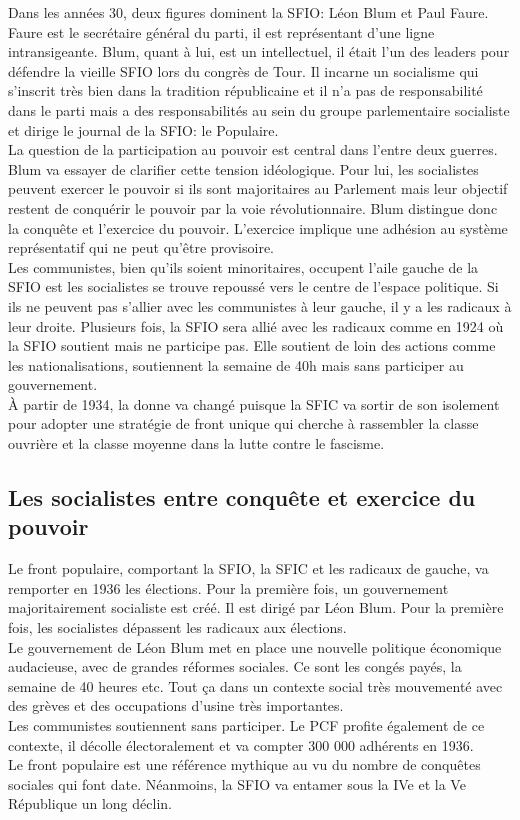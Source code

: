 \documentclass[10pt, a4paper, openany]{book}
\begin{document}
Dans les années 30, deux figures dominent la SFIO: Léon Blum et Paul Faure. Faure est le secrétaire général du parti, il est représentant d'une ligne intransigeante. Blum, quant à lui, est un intellectuel, il était l'un des leaders pour défendre la vieille SFIO lors du congrès de Tour. Il incarne un socialisme qui s'inscrit très bien dans la tradition républicaine et il n'a pas de responsabilité dans le parti mais a des responsabilités au sein du groupe parlementaire socialiste et dirige le journal de la SFIO: le Populaire. \\
La question de la participation au pouvoir est central dans l'entre deux guerres. Blum va essayer de clarifier cette tension idéologique. Pour lui, les socialistes peuvent exercer le pouvoir si ils sont majoritaires au Parlement mais leur objectif restent de conquérir le pouvoir par la voie révolutionnaire. Blum distingue donc la conquête et l'exercice du pouvoir. L'exercice implique une adhésion au système représentatif qui ne peut qu'être provisoire. \\
Les communistes, bien qu'ils soient minoritaires, occupent l'aile gauche de la SFIO est les socialistes se trouve repoussé vers le centre de l'espace politique. Si ils ne peuvent pas s'allier avec les communistes à leur gauche, il y a les radicaux à leur droite. Plusieurs fois, la SFIO sera allié avec les radicaux comme en 1924 où la SFIO soutient mais ne participe pas. Elle soutient de loin des actions comme les nationalisations, soutiennent la semaine de 40h mais sans participer au gouvernement. \\
À partir de 1934, la donne va changé puisque la SFIC va sortir de son isolement pour adopter une stratégie de front unique qui cherche à rassembler la classe ouvrière et la classe moyenne dans la lutte contre le fascisme. 


\subsection{Les socialistes entre conquête et exercice du pouvoir}

Le front populaire, comportant la SFIO, la SFIC et les radicaux de gauche, va remporter en 1936 les élections. Pour la première fois, un gouvernement majoritairement socialiste est créé. Il est dirigé par Léon Blum. Pour la première fois, les socialistes dépassent les radicaux aux élections. \\
Le gouvernement de Léon Blum met en place une nouvelle politique économique audacieuse, avec de grandes réformes sociales. Ce sont les congés payés, la semaine de 40 heures etc. Tout ça dans un contexte social très mouvementé avec des grèves et des occupations d'usine très importantes. \\
Les communistes soutiennent sans participer. Le PCF profite également de ce contexte, il décolle électoralement et va compter 300 000 adhérents en 1936. \\
Le front populaire est une référence mythique au vu du nombre de conquêtes sociales qui font date. Néanmoins, la SFIO va entamer sous la IVe et la Ve République un long déclin.
\end{document}
